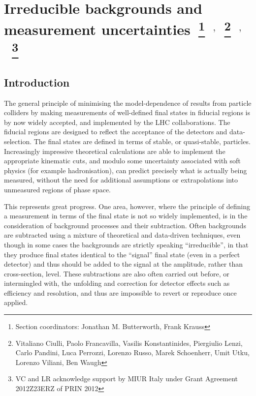 \documentclass[11pt]{cernrep}
\begin{document}
 
\section{Irreducible backgrounds and measurement uncertainties~\protect\footnote{Section
  coordinators: Jonathan M. Butterworth, Frank Krauss }~$^{,}$~\protect\footnote{Vitaliano Ciulli, Paolo
  Francavilla, Vasilis Konstantinides, Piergiulio Lenzi, Carlo Pandini, Luca Perrozzi, Lorenzo Russo, Marek Schoenherr,
  Umit Utku, Lorenzo Viliani, Ben Waugh}~$^{,}$~\protect\footnote{VC and LR
  acknowledge support by MIUR Italy under Grant Agreement 2012Z23ERZ of PRIN 2012}}



\subsection{Introduction}
\label{sec:intro}

The general principle of minimising the model-dependence of results from particle colliders by making measurements of 
well-defined final states in fiducial regions is by now widely accepted, and implemented by the LHC collaborations. 
The fiducial regions are designed to reflect the acceptance of the detectors and data-selection. 
The final states are defined in terms of stable, or quasi-stable,
particles. Increasingly impressive theoretical calculations are able to implement the appropriate kinematic cuts, and
modulo some uncertainty associated with soft physics (for example hadronisation), can predict precisely what 
is actually being measured, without the need for additional assumptions or extrapolations into unmeasured regions of 
phase space.

This represents great progress. One area, however, where the principle of defining a measurement in terms of the final state
is not so widely implemented, is in the consideration of background processes and their subtraction. 
Often backgrounds are subtracted using a mixture of theoretical and data-driven techniques, 
even though in some cases the backgrounds are strictly speaking ``irreducible'', in that they produce final states 
identical to the ``signal'' final state (even in a perfect detector) and thus should be added to the signal 
at the amplitude, rather than cross-section, level. These subtractions are also often carried out before, or intermingled with, 
the unfolding and correction for detector effects such as efficiency and resolution, and thus are 
impossible to revert or reproduce once applied.
\end{document}

